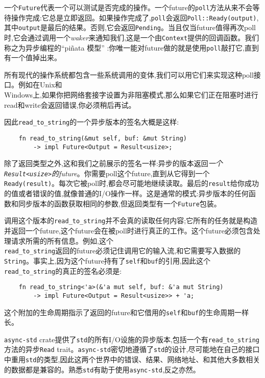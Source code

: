 一个\texttt{Future}代表一个可以测试是否完成的操作。一个future的\texttt{poll}方法从来不会等待操作完成:它总是立即返回。如果操作完成了,\texttt{poll}会返回\texttt{Poll::Ready(output)},其中\texttt{output}是最后的结果。否则,它会返回\texttt{Pending}。当且仅当future值得再次poll时,它会通过调用一个\emph{waker}来通知我们,这是一个由\texttt{Context}提供的回调函数。我们称之为异步编程的“piñata 模型” :你唯一能对future做的就是使用\texttt{poll}敲打它,直到有一个值掉出来。

所有现代的操作系统都包含一些系统调用的变体,我们可以用它们来实现这种poll接口。例如在Unix和\\
Windows上,如果你把网络套接字设置为非阻塞模式,那么如果它们正在阻塞时进行read和write会返回错误,你必须稍后再试。

因此\texttt{read\_to\_string}的一个异步版本的签名大概是这样:
\begin{verbatim}
    fn read_to_string(&mut self, buf: &mut String)
        -> impl Future<Output = Result<usize>;
\end{verbatim}

除了返回类型之外,这和我们之前展示的签名一样:异步的版本返回\emph{一个\texttt{Result<usize>}的future}。你需要poll这个future,直到从它得到一个\texttt{Ready(result)}。每次它被poll时,都会尽可能地继续读取。最后的\texttt{result}给你成功的值或者错误的值,就像普通的I/O操作一样。这是通常的模式:异步版本的任何函数和同步版本的函数获取相同的参数,但返回类型有一个\texttt{Future}包装。

调用这个版本的\texttt{read\_to\_string}并不会真的读取任何内容;它所有的任务就是构造并返回一个future,这个future会在被poll时进行真正的工作。这个future必须包含处理请求所需的所有信息。例如,这个\\
\texttt{read\_to\_string}返回的future必须记住调用它的输入流,和它需要写入数据的\texttt{String}。事实上,因为这个future持有了\texttt{self}和\texttt{buf}的引用,因此这个\texttt{read\_to\_string}的真正的签名必须是:
\begin{verbatim}
    fn read_to_string<'a>(&'a mut self, buf: &'a mut String)
        -> impl Future<Output = Result<usize>> + 'a;
\end{verbatim}

这个附加的生命周期指示了返回的future和它借用的\texttt{self}和\texttt{buf}的生命周期一样长。

\texttt{async-std} crate提供了\texttt{std}的所有I/O设施的异步版本,包括一个有\texttt{read\_to\_string}方法的异步\texttt{Read} trait。\texttt{async-std}密切地遵循了\texttt{std}的设计,尽可能地在自己的接口中重用\texttt{std}的类型,因此这两个世界中的错误、结果、网络地址、和其他大多数相关的数据都是兼容的。熟悉\texttt{std}有助于使用\texttt{async-std},反之亦然。

